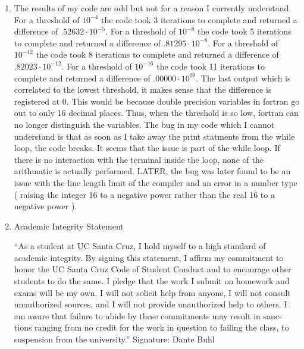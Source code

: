 \documentclass[11pt]{article}
\begin{document}
\begin{enumerate}
\item
The results of my code are odd but not for a reason I currently understand. For a threshold of $10^{-4}$ the code took 3 iterations to complete and returned a difference of $.52632 \cdot 10^{-5}$. For a threshold of $10^{-8}$ the code took 5 iterations to complete and returned a difference of $.81295 \cdot 10^{-8}$. For a threshold of $10^{-12}$ the code took 8 iterations to complete and returned a difference of $.82023 \cdot 10^{-12}$. For a threshold of $10^{-16}$ the code took 11 iterations to complete and returned a difference of $.00000 \cdot 10^{00}$. The last output which is correlated to the lowest threshold, it makes sense that the difference is registered at 0. This would be because double precision variables in fortran go out to only 16 decimal places. Thus, when the threshold is so low, fortran can no longer distinguish the variables. The bug in my code which I cannot understand is that as soon as I take away the print statments from the while loop, the code breaks. It seems that the issue is part of the while loop. If there is no interaction with the terminal inside the loop, none of the arithmatic is actually performed. LATER, the bug was later found to be an issue with the line length limit of the compiler and an error in a number type ( raising the integer 16 to a negative power rather than the real 16 to a negative power ).

\item  Academic Integrity Statement

“As a student at UC Santa Cruz, I hold myself to a high standard of
academic integrity. By signing this statement, I affirm my commitment
to honor the UC Santa Cruz Code of Student Conduct and to encourage
other students to do the same.
I pledge that the work I submit on homework and exams will be my own. I
will not solicit help from anyone, I will not consult unauthorized sources,
and I will not provide unauthorized help to others.
I am aware that failure to abide by these commitments may result in sanc-
tions ranging from no credit for the work in question to failing the class,
to suspension from the university.”
Signature: Dante Buhl 



\end{enumerate}
%

%
\end{document}

